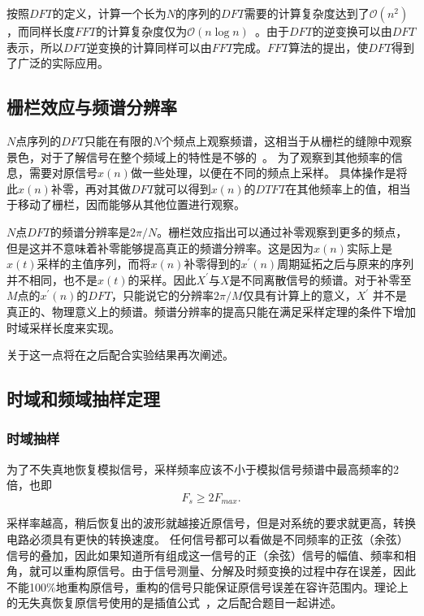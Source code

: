 \documentclass[a4paper,11pt,onecolumn,twoside]{article}
\begin{document}
按照$DFT$的定义，计算一个长为$N$的序列的$DFT$需要的计算复杂度达到了${\mathcal {O}}(n^{2})$，而同样长度$FFT$的计算复杂度仅为${\mathcal {O}}(n\log n)$~\supercite{course3}。由于$DFT$的逆变换可以由$DFT$表示，所以$DFT$逆变换的计算同样可以由$FFT$完成。$FFT$算法的提出，使$DFT$得到了广泛的实际应用。

\subsection{栅栏效应与频谱分辨率}
$N$点序列的$DFT$只能在有限的$N$个频点上观察频谱，这相当于从栅栏的缝隙中观察景色，对于了解信号在整个频域上的特性是不够的~\supercite{textbook}。 为了观察到其他频率的信息，需要对原信号$x(n)$做一些处理，以便在不同的频点上采样。
具体操作是将此$x(n)$补零，再对其做$DFT$就可以得到$x(n)$的$DTFT$在其他频率上的值，相当于移动了栅栏，因而能够从其他位置进行观察。

$N$点$DFT$的频谱分辨率是$2\pi /N$。栅栏效应指出可以通过补零观察到更多的频点，但是这并不意味着补零能够提高真正的频谱分辨率。这是因为$x(n)$实际上是$x(t)$采样的主值序列，而将$x(n)$补零得到的$x^{'}(n)$周期延拓之后与原来的序列并不相同，也不是$x(t)$的采样。因此$X^{'}$与$X$是不同离散信号的频谱。对于补零至$M$点的$x^{'}(n)$的$DFT$，只能说它的分辨率$2\pi /M$仅具有计算上的意义，$X^{'}$ 并不是真正的、物理意义上的频谱。频谱分辨率的提高只能在满足采样定理的条件下增加时域采样长度来实现。

关于这一点将在之后配合实验结果再次阐述。

\subsection{时域和频域抽样定理}

\subsubsection{时域抽样}
为了不失真地恢复模拟信号，采样频率应该不小于模拟信号频谱中最高频率的2倍，也即
\begin{equation}
F_s \geq 2F_{max}.
\end{equation}

采样率越高，稍后恢复出的波形就越接近原信号，但是对系统的要求就更高，转换电路必须具有更快的转换速度。
任何信号都可以看做是不同频率的正弦（余弦）信号的叠加，因此如果知道所有组成这一信号的正（余弦）信号的幅值、频率和相角，就可以重构原信号。由于信号测量、分解及时频变换的过程中存在误差，因此不能100\%地重构原信号，重构的信号只能保证原信号误差在容许范围内。理论上的无失真恢复原信号使用的是插值公式~\supercite{textbook}，之后配合题目一起讲述。
\end{document}
